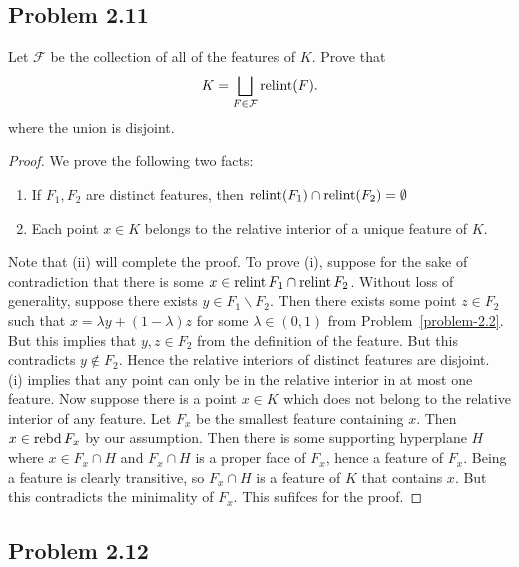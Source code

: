 \documentclass[12pt]{article}
\begin{document}
\newpage 

\subsection{Problem 2.11}

\begin{problem}
	Let $\mathcal{F}$ be the collection of all of the features of $K$. Prove that 
    \[
        K = \bigsqcup_{F \in \mathcal{F}} \operatorname{relint} (F).
    \]
    where the union is disjoint. 
\end{problem}

\begin{proof}
	We prove the following two facts:
	\begin{enumerate}[label = (\roman*)]
		\item If $F_1, F_2$ are distinct features, then $\operatorname{relint} (F_1) \cap \operatorname{relint} (F_2) = \emptyset$
		\item Each point $x \in K$ belongs to the relative interior of a unique feature of $K$. 
	\end{enumerate} 	
	Note that (ii) will complete the proof. To prove (i), suppose for the sake of contradiction that there is some $x \in \operatorname{relint} F_1 \cap \operatorname{relint} F_2$. Without loss of generality, suppose there exists $y \in F_1 \backslash F_2$. Then there exists some point $z \in F_2$ such that $x = \lambda y + (1 - \lambda)z $ for some $\lambda \in (0, 1)$ from Problem~\ref{problem-2.2}. But this implies that $y, z \in F_2$ from the definition of the feature. But this contradicts $y \notin F_2$. Hence the relative interiors of distinct features are disjoint. \\

	(i) implies that any point can only be in the relative interior in at most one feature. Now suppose there is a point $x \in K$ which does not belong to the relative interior of any feature. Let $F_x$ be the smallest feature containing $x$. Then $x \in \operatorname{rebd} F_x$ by our assumption. Then there is some supporting hyperplane $H$ where $x \in F_x \cap H$ and $F_x \cap H$ is a proper face of $F_x$, hence a feature of $F_x$. Being a feature is clearly transitive, so $F_x \cap H$ is a feature of $K$ that contains $x$. But this contradicts the minimality of $F_x$. This sufifces for the proof. 
\end{proof}

\newpage 

\subsection{Problem 2.12}
\end{document}
